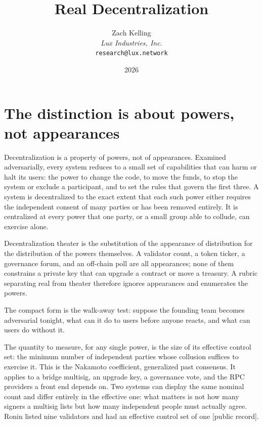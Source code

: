 \documentclass[11pt,a4paper]{article}
\title{Real Decentralization}
\author{Zach Kelling\\\textit{Lux Industries, Inc.}\\\texttt{research@lux.network}}
\date{2026}
\newcommand{\pv}[1]{{\color{muted}\sffamily\scriptsize[#1]}}
\begin{document}
\luxcoverpage
\sloppy

\par
\vspace{0.8ex}
\par
\vspace{0.4ex}
\par
\vspace{0.7ex}
\noindent{\color{rule}\rule{\linewidth}{1.1pt}}\par
\vspace{1.0ex}

\section{The distinction is about powers, not appearances}

Decentralization is a property of powers, not of appearances. Examined
adversarially, every system reduces to a small set of capabilities that can harm
or halt its users: the power to change the code, to move the funds, to stop the
system or exclude a participant, and to set the rules that govern the first
three. A system is decentralized to the exact extent that each such power either
requires the independent consent of many parties or has been removed entirely. It
is centralized at every power that one party, or a small group able to collude,
can exercise alone.

Decentralization theater is the substitution of the appearance of distribution
for the distribution of the powers themselves. A validator count, a token ticker,
a governance forum, and an off-chain poll are all appearances; none of them
constrains a private key that can upgrade a contract or move a treasury. A rubric
separating real from theater therefore ignores appearances and enumerates the powers.

The compact form is the walk-away test: suppose the founding team becomes adversarial
tonight, what can it do to users before anyone reacts, and what can users do without it.

The quantity to measure, for any single power, is the size of its effective control
set: the minimum number of independent parties whose collusion suffices to exercise
it. This is the Nakamoto coefficient, generalized past consensus. It applies to a
bridge multisig, an upgrade key, a governance vote, and the RPC providers a front
end depends on. Two systems can display the same nominal count and differ entirely
in the effective one: what matters is not how many signers a multisig lists but how
many independent people must actually agree. Ronin listed nine validators and had an
effective control set of one \pv{public record}.
\end{document}
